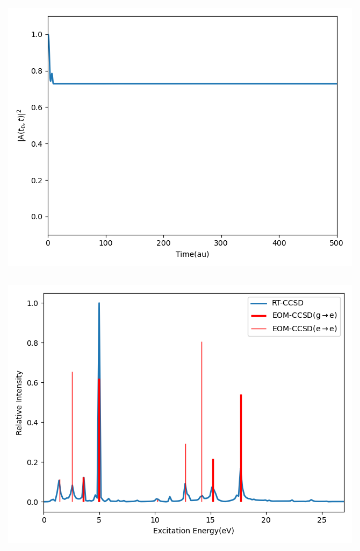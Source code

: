 \begin{figure}
\begin{subfigure}{0.47\textwidth}
         \includegraphics[width=\textwidth]{ch4/Figs/12-3.png}
     \end{subfigure}
     \hfill
     \begin{subfigure}{0.47\textwidth}
         \centering
         \includegraphics[width=\textwidth]{ch4/Figs/12-4.png}
     \end{subfigure}
      \vfill
     \begin{subfigure}{0.47\textwidth}
         \centering

\end{subfigure}
\end{figure}
